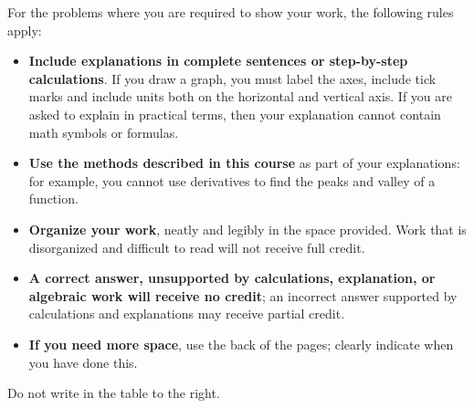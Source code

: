 \documentclass[11pt,answers]{exam}
\begin{document}
For the problems where you are required to show your work, the following rules apply:\\

\begin{minipage}[t]{3.7in}
\vspace{0pt}
\begin{itemize}

\item \textbf{Include explanations in complete sentences or step-by-step calculations}. If you draw a graph, you must label the axes, include tick marks and include units both on the horizontal and vertical axis. If you are asked to explain in practical terms, then your explanation cannot contain math symbols or formulas.
\item \textbf{Use the methods described in this course} as part of your explanations: for example, you cannot use derivatives to find the peaks and valley of a function.

\item \textbf{Organize your work}, neatly and legibly in
the space provided. Work that is disorganized and difficult to read will not receive full credit.  

\item \textbf{A correct answer, unsupported by calculations, explanation,
or algebraic work will receive no credit}; an incorrect answer supported
by  calculations and explanations may receive
partial credit.


\item \textbf{If you need more space}, use the back of the pages; clearly indicate when you have done this.
\end{itemize}

Do not write in the table to the right.
\end{minipage}
\hfill
\begin{minipage}[t]{2.3in}
\vspace{0pt}
\addpoints %
\combinedgradetable[v][pages]  %

\end{minipage}
\newpage



\end{document}
